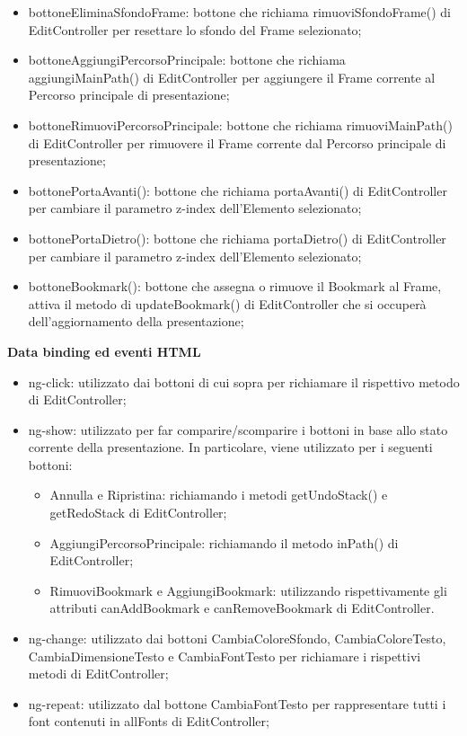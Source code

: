 {{\begin{itemize}
		\item bottoneEliminaSfondoFrame: bottone che richiama rimuoviSfondoFrame() di EditController per resettare lo sfondo del Frame selezionato;
		\item bottoneAggiungiPercorsoPrincipale: bottone che richiama aggiungiMainPath() di EditController per aggiungere il Frame corrente al Percorso principale di presentazione;
		\item bottoneRimuoviPercorsoPrincipale: bottone che richiama rimuoviMainPath() di EditController per rimuovere il Frame corrente dal Percorso principale di presentazione;
		\item bottonePortaAvanti(): bottone che richiama portaAvanti() di EditController per cambiare il parametro z-index dell'Elemento selezionato;
		\item bottonePortaDietro(): bottone che richiama portaDietro() di EditController per cambiare il parametro z-index dell'Elemento selezionato;
		\item bottoneBookmark(): bottone che assegna o rimuove il Bookmark al Frame, attiva il metodo di updateBookmark() di EditController che si occuperà dell'aggiornamento della presentazione;
	\end{itemize}
	\textbf{Data binding ed eventi HTML}
	\begin{itemize}
		\item ng-click: utilizzato dai bottoni di cui sopra per richiamare il rispettivo metodo di EditController;
		\item ng-show: utilizzato per far comparire/scomparire i bottoni in base allo stato corrente della presentazione. In particolare, viene utilizzato per i seguenti bottoni:
		\begin{itemize}
			\item Annulla e Ripristina: richiamando i metodi getUndoStack() e getRedoStack di EditController;
			\item AggiungiPercorsoPrincipale: richiamando il metodo inPath() di EditController;
			\item RimuoviBookmark e AggiungiBookmark: utilizzando rispettivamente gli attributi canAddBookmark e canRemoveBookmark di EditController.
		\end{itemize}
		\item ng-change: utilizzato dai bottoni CambiaColoreSfondo, CambiaColoreTesto, CambiaDimensioneTesto e CambiaFontTesto per richiamare i rispettivi metodi di EditController;
		\item ng-repeat: utilizzato dal bottone CambiaFontTesto per rappresentare tutti i font contenuti in allFonts di EditController;

\end{itemize}}}
